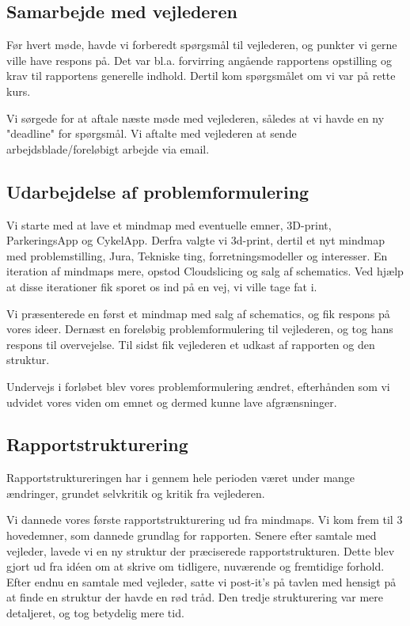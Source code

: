\subsection{Samarbejde med vejlederen}


Før hvert møde, havde vi forberedt spørgsmål til vejlederen, og punkter vi gerne ville have respons på. Det var bl.a. forvirring angående rapportens opstilling og krav til rapportens generelle indhold. Dertil kom spørgsmålet om vi var på rette kurs.

Vi sørgede for at aftale næste møde med vejlederen, således at vi havde en ny "deadline" for spørgsmål. Vi aftalte med vejlederen at sende arbejdsblade/foreløbigt arbejde via email.



\subsection{Udarbejdelse af problemformulering}

Vi starte med at lave et mindmap med eventuelle emner, 3D-print, ParkeringsApp og CykelApp. Derfra valgte vi 3d-print, dertil et nyt mindmap med problemstilling, Jura, Tekniske ting, forretningsmodeller og interesser. En iteration af mindmaps mere, opstod Cloudslicing og salg af schematics. Ved hjælp at disse iterationer fik sporet os ind på en vej, vi ville tage fat i.

Vi præsenterede en først et mindmap med salg af schematics, og fik respons på vores ideer. Dernæst en foreløbig problemformulering til vejlederen, og tog hans respons til overvejelse. Til sidst fik vejlederen et udkast af rapporten og den struktur.

Undervejs i forløbet blev vores problemformulering ændret, efterhånden som vi udvidet vores viden om emnet og dermed kunne lave afgrænsninger.


\subsection{Rapportstrukturering}


Rapportstruktureringen har i gennem hele perioden været under mange ændringer, grundet selvkritik og kritik fra vejlederen.

Vi dannede vores første rapportstrukturering ud fra mindmaps. Vi kom frem til 3 hovedemner, som dannede grundlag for rapporten. Senere efter samtale med vejleder, lavede vi en ny struktur der præciserede rapportstrukturen. Dette blev gjort ud fra idéen om at skrive om tidligere, nuværende og fremtidige forhold. Efter endnu en samtale med vejleder, satte vi post-it's på tavlen med hensigt på at finde en struktur der havde en rød tråd. Den tredje strukturering var mere detaljeret, og tog betydelig mere tid.

